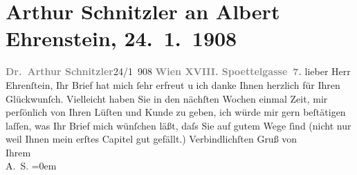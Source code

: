 

               \section[Arthur Schnitzler an Albert Ehrenstein, 24. 1. 1908]{ Arthur Schnitzler an Albert Ehrenstein, 24. 1. 1908}\nopagebreak{}\rehead{ }\begin{ledgroupsized}[t]{13cm}\normalsize\beginnumbering{} \toendnotes[C]{\smallbreak\pagebreak[2]} 
\toendnotes[C]{\smallbreak}\pstart
           \noindent{}{\pb}\textcolor{gray}{\textbf{Dr. Arthur Schnitzler}}\hfill 24/1 908\pend
           \pstart
           \textcolor{gray}{\textbf{Wien XVIII. Spoettelgasse 7.}}\pend
           \pstart
           lieber Herr Ehrenſtein, Ihr Brief hat mich ſehr erfreut u ich danke
               Ihnen herzlich für Ihren Glückwunſch. Vielleicht haben Sie in den nächſten Wochen
               einmal Zeit, mir perſönlich von Ihren Lüſten und \label{T_L01757_1v}\label{T_L01757_1h} Kunde zu geben, ich würde mir
               gern beſtätigen {\pb}laſſen, was Ihr Brief mich wünſchen läßt, daſs
               Sie auf gutem Wege ſind (nicht nur weil Ihnen mein erſtes Capitel gut gefällt.)\pend
           \pstart
           Verbindlichſten Gruß von{\\[\baselineskip]} Ihrem{\\[\baselineskip]}\spacefill\mbox{A. S.}\pend
           \leftskip=0em{}          \endnumbering{}\end{ledgroupsized}  \newcommand{\dateiname}{L01757}\newcommand{\titel}{Arthur Schnitzler an Albert Ehrenstein, 24. 1. 1908}\newcommand{\editorInnen}{Martin Anton Müller und Gerd-Hermann Susen}
            \footnotesize
\begin{ledgroupsized}[t]{11.5cm}
\end{ledgroupsized}
         
      